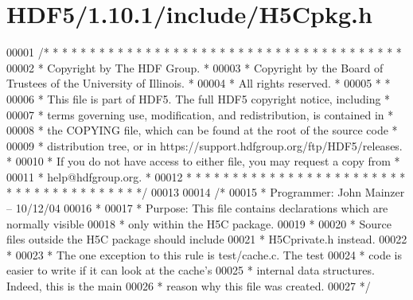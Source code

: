 \hypertarget{_h_d_f5_21_810_81_2include_2_h5_cpkg_8h_source}{}\section{H\+D\+F5/1.10.1/include/\+H5\+Cpkg.h}
\label{_h_d_f5_21_810_81_2include_2_h5_cpkg_8h_source}

\begin{DoxyCode}
00001 \textcolor{comment}{/* * * * * * * * * * * * * * * * * * * * * * * * * * * * * * * * * * * * * * *}
00002 \textcolor{comment}{ * Copyright by The HDF Group.                                               *}
00003 \textcolor{comment}{ * Copyright by the Board of Trustees of the University of Illinois.         *}
00004 \textcolor{comment}{ * All rights reserved.                                                      *}
00005 \textcolor{comment}{ *                                                                           *}
00006 \textcolor{comment}{ * This file is part of HDF5.  The full HDF5 copyright notice, including     *}
00007 \textcolor{comment}{ * terms governing use, modification, and redistribution, is contained in    *}
00008 \textcolor{comment}{ * the COPYING file, which can be found at the root of the source code       *}
00009 \textcolor{comment}{ * distribution tree, or in https://support.hdfgroup.org/ftp/HDF5/releases.  *}
00010 \textcolor{comment}{ * If you do not have access to either file, you may request a copy from     *}
00011 \textcolor{comment}{ * help@hdfgroup.org.                                                        *}
00012 \textcolor{comment}{ * * * * * * * * * * * * * * * * * * * * * * * * * * * * * * * * * * * * * * */}
00013 
00014 \textcolor{comment}{/*}
00015 \textcolor{comment}{ * Programmer: John Mainzer -- 10/12/04}
00016 \textcolor{comment}{ *}
00017 \textcolor{comment}{ * Purpose:     This file contains declarations which are normally visible}
00018 \textcolor{comment}{ *              only within the H5C package.}
00019 \textcolor{comment}{ *}
00020 \textcolor{comment}{ *      Source files outside the H5C package should include}
00021 \textcolor{comment}{ *      H5Cprivate.h instead.}
00022 \textcolor{comment}{ *}
00023 \textcolor{comment}{ *      The one exception to this rule is test/cache.c.  The test}
00024 \textcolor{comment}{ *      code is easier to write if it can look at the cache's}
00025 \textcolor{comment}{ *      internal data structures.  Indeed, this is the main}
00026 \textcolor{comment}{ *      reason why this file was created.}
00027 \textcolor{comment}{ */}

\end{DoxyCode}
